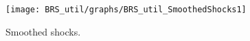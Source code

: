  
\begin{figure}[H]
\centering 
\texttt{[image: BRS\_util/graphs/BRS\_util\_SmoothedShocks1]}
\caption{Smoothed shocks.}\label{Fig:SmoothedShocks:1}
\end{figure}


